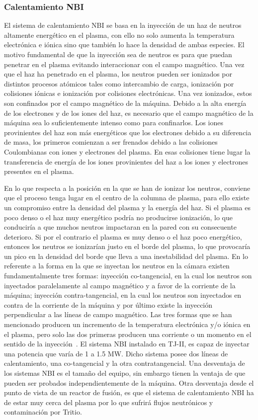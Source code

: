 \subsubsection*{Calentamiento NBI}
El sistema de calentamiento NBI se basa en la inyección de un haz de neutros altamente
energético en el plasma, con ello no solo aumenta la temperatura electrónica e iónica sino que
también lo hace la densidad de ambas especies. El motivo fundamental de que la inyección
sea de neutros es para que puedan penetrar en el plasma evitando interaccionar con el campo
magnético.
Una vez que el haz ha penetrado en el plasma, los neutros pueden ser ionizados por distintos
procesos atómicos tales como intercambio de carga, ionización por colisiones iónicas e
ionización por colisiones electrónicas. Una vez ionizados, estos son confinados por el campo
magnético de la máquina. Debido a la alta energía de los electrones y de los iones del haz,
es necesario que el campo magnético de la máquina sea lo suficientemente intenso como para
confinarlos.
Los iones provinientes del haz son más energéticos que los electrones debido a su diferencia de
masa, los primeros comienzan a ser frenados debido a las colisiones Coulombianas con iones
y electrones del plasma. En esas colisiones tiene lugar la transferencia de energía de los iones
provinientes del haz a los iones y electrones presentes en el plasma.\par
En lo que respecta a la posición en la que se han de ionizar los neutros, conviene que el
proceso tenga lugar en el centro de la columna de plasma, para ello existe un compromiso
entre la densidad del plasma y la energía del haz. Si el plasma es poco denso o el haz muy
energético podría no producirse ionización, lo que conduciría a que muchos neutros impactaran
en la pared con su consecuente deterioro. Si por el contrario el plasma es muy denso
o el haz poco energético, entonces los neutros se ionizarían justo en el borde del plasma, lo
que provocaría un pico en la densidad del borde que lleva a una inestabilidad del plasma.
En lo referente a la forma en la que se inyectan los neutros en la cámara existen fundamentalmente
tres formas: inyección co-tangencial, en la cual los neutros son inyectados paralelamente
al campo magnético y a favor de la corriente de la máquina; inyección contra-tangencial, en
la cual los neutros son inyectados en contra de la corriente de la máquina y por último existe
la inyección perpendicular a las líneas de campo magnético. Las tres formas que se han mencionado
producen un incremento de la temperatura electrónica y/o iónica en el plasma, pero
solo las dos primeras producen una corriente o un momento en el sentido de la inyección~\cite{wesson2004tokamaks}.
El sistema NBI instalado en TJ-II, es capaz de inyectar una potencia que varía de 1 a 1.5
MW. Dicho sistema posee dos líneas de calentamiento, una co-tangencial y la otra contratangencial.
Una desventaja de los sistemas NBI es el tamaño del equipo, sin embargo tienen la ventaja
de que pueden ser probados independientemente de la máquina. Otra desventaja desde el
punto de vista de un reactor de fusión, es que el sistema de calentamiento NBI ha de estar
muy cerca del plasma por lo que sufrirá flujos neutrónicos y contaminación por Tritio.